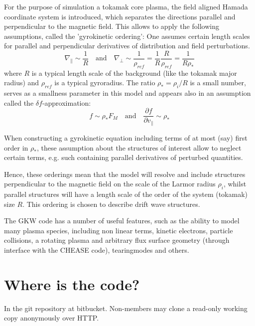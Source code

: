 \documentclass[a4paper,10pt]{article}
\newcommand{\pd}[2]{\frac{\partial #1}{\partial #2}} %
\begin{document}
For the purpose of simulation a tokamak core plasma, the field aligned Hamada coordinate system is
introduced, which separates the directions parallel and perpendicular to the
magnetic field. This allows to apply the following assumptions, called the
'gyrokinetic ordering': One assumes certain length
scales for parallel and perpendicular derivatives of distribution and
field perturbations.
\begin{equation}
\nabla_\parallel  \sim \frac{1}{R} \quad \mathrm{and}\quad
\nabla_\perp \sim \frac{1}{\rho_{ref}} =  \frac{1}{R}\frac{R}{\rho_{ref}} = \frac{1}{R\rho_*}
\end{equation}
where $R$ is a typical length scale of the background (like the
tokamak major radius) and $\rho_{ref}$ is a typical gyroradius. The
ratio $\rho_*=\rho_i/R$ is a small number, serves as a smallness
parameter in this model and appears also in an assumption called the
$\delta f$-approximation:
\begin{equation}
  f \sim \rho_*F_M\quad\mathrm{and}\quad \pd{f}{v_\parallel}\sim\rho_*
\end{equation}

When constructing a gyrokinetic equation including terms of at most (say) first
order in $\rho_*$, these assumption about the structures of interest
allow to neglect certain terms, e.g. such containing parallel derivatives
of perturbed quantities.

Hence, these orderings mean that the model will resolve and include structures
perpendicular to the magnetic field on the scale of the Larmor radius
$\rho_i$, whilst parallel structures will have a length scale of the
order of the system (tokamak) size $R$. This ordering is chosen to
describe drift wave structures.

The GKW code has a number of useful features, such as the ability
to model many plasma species, including non linear terms, kinetic
electrons, particle collisions, a rotating plasma and arbitrary flux
surface geometry (through interface with the CHEASE code),
tearingmodes and others.

\section{Where is the code?}

In the git repository at bitbucket.  Non-members may clone a read-only working copy anonymously over HTTP.  
\end{document}
